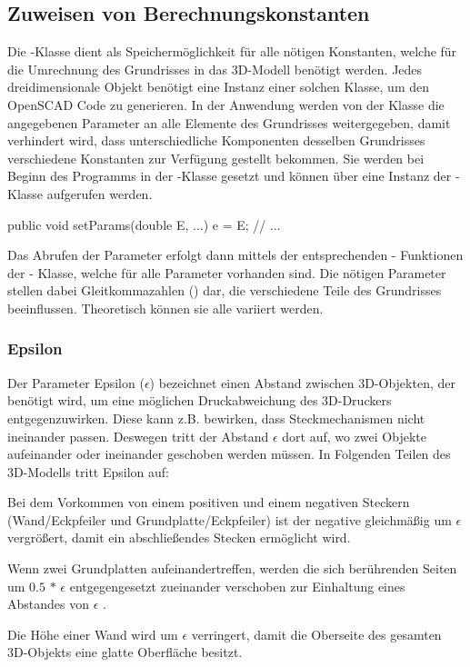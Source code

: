 \subsection{Zuweisen von Berechnungskonstanten}
\label{params}
Die -Klasse dient als Speichermöglichkeit für alle nötigen Konstanten, welche für die Umrechnung des Grundrisses in das 3D-Modell benötigt werden.
Jedes dreidimensionale Objekt benötigt eine Instanz einer solchen Klasse, um den OpenSCAD Code zu generieren.
In der Anwendung werden von der Klasse  die angegebenen Parameter an alle Elemente des Grundrisses weitergegeben, damit verhindert wird, dass unterschiedliche Komponenten desselben Grundrisses verschiedene Konstanten zur Verfügung gestellt bekommen.
Sie werden bei Beginn des Programms in der -Klasse gesetzt und können über eine Instanz der -Klasse aufgerufen werden. \\

\begin{code} 
	public void setParams(double E, ...){
		e = E;
		// ...
	}
\end{code}

Das Abrufen der Parameter erfolgt dann mittels der entsprechenden - Funktionen der - Klasse, welche für alle Parameter vorhanden sind. 
Die nötigen Parameter stellen dabei Gleitkommazahlen () dar, die verschiedene Teile des Grundrisses beeinflussen. 
Theoretisch können sie alle variiert werden.

\subsubsection{Epsilon}
Der Parameter Epsilon ({\Large$\epsilon$}) bezeichnet einen Abstand zwischen 3D-Objekten, der benötigt wird, um eine möglichen Druckabweichung des 3D-Druckers entgegenzuwirken.
Diese kann z.B. bewirken, dass Steckmechanismen nicht ineinander passen.
Deswegen tritt der Abstand {\Large$\epsilon$} dort auf, wo zwei Objekte aufeinander oder ineinander geschoben werden müssen.
In Folgenden Teilen des 3D-Modells tritt Epsilon auf:

\begin{compactenum}
	\item Bei dem Vorkommen von einem positiven und einem negativen Steckern (Wand/Eckpfeiler und Grundplatte/Eckpfeiler) ist der negative gleichmäßig um {\Large$\epsilon$} vergrößert, damit ein abschließendes Stecken ermöglicht wird.
	\item Wenn zwei Grundplatten aufeinandertreffen, werden die sich berührenden Seiten um $0.5$ $*$ {\Large$\epsilon$} entgegengesetzt zueinander verschoben zur Einhaltung eines Abstandes von {\Large$\epsilon$} .
	\item Die Höhe einer Wand wird um {\Large$\epsilon$} verringert, damit die Oberseite des gesamten 3D-Objekts eine glatte Oberfläche besitzt.
\end{compactenum}

